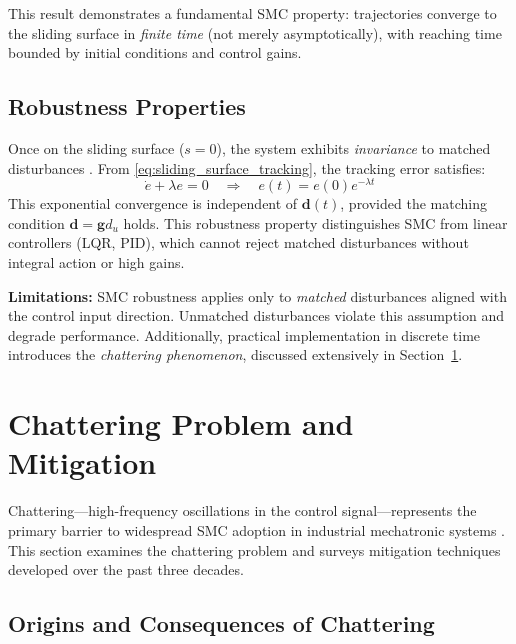 This result demonstrates a fundamental SMC property: trajectories converge to the sliding surface in \emph{finite time} (not merely asymptotically), with reaching time bounded by initial conditions and control gains.

\subsection{Robustness Properties}

Once on the sliding surface ($s = 0$), the system exhibits \emph{invariance} to matched disturbances \cite{utkin1992sliding}. From \eqref{eq:sliding_surface_tracking}, the tracking error satisfies:
\begin{equation}
\dot{e} + \lambda e = 0 \quad \Rightarrow \quad e(t) = e(0) e^{-\lambda t}
\label{eq:error_dynamics_sliding}
\end{equation}
This exponential convergence is independent of $\mathbf{d}(t)$, provided the matching condition $\mathbf{d} = \mathbf{g} d_u$ holds. This robustness property distinguishes SMC from linear controllers (LQR, PID), which cannot reject matched disturbances without integral action or high gains.

\textbf{Limitations:} SMC robustness applies only to \emph{matched} disturbances aligned with the control input direction. Unmatched disturbances violate this assumption and degrade performance. Additionally, practical implementation in discrete time introduces the \emph{chattering phenomenon}, discussed extensively in Section~\ref{sec:chattering_mitigation}.

\section{Chattering Problem and Mitigation}
\label{sec:chattering_mitigation}

Chattering—high-frequency oscillations in the control signal—represents the primary barrier to widespread SMC adoption in industrial mechatronic systems \cite{young1999survey,bartolini1998chattering}. This section examines the chattering problem and surveys mitigation techniques developed over the past three decades.

\subsection{Origins and Consequences of Chattering}

